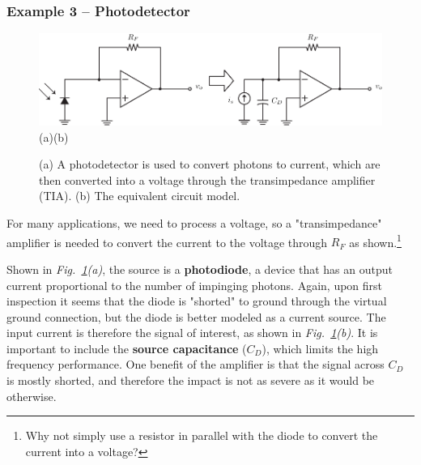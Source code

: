 \subsubsection{Example 3 – Photodetector}
\begin{figure}[tb]
\centering
\includegraphics[width=.8\columnwidth]{ex_photodetect}\\
(a)\hspace{6cm}(b)
\caption{(a) A photodetector is used to convert photons to current, which are then converted into a voltage through the transimpedance amplifier (TIA).  (b) The equivalent circuit model.}
\label{fig:pd_detect}
\end{figure}
For many applications, we need to process a voltage, so a "transimpedance" amplifier is needed to convert the current to the voltage through $R_F$ as shown.\footnote{Why not simply use a resistor in parallel with the diode to convert the current into a voltage?}

Shown in \emph{Fig.~\ref{fig:pd_detect}(a)}, the source is a \textbf{photodiode}, a device that has an output current proportional to the number of impinging photons.  Again, upon first inspection it seems that the diode is "shorted" to ground through the virtual ground connection, but the diode is better modeled as a current source.  The input current is therefore the signal of interest, as shown in \emph{Fig.~\ref{fig:pd_detect}(b)}.  It is important to include the \textbf{source capacitance} ($C_D$), which limits the high frequency performance.  One benefit of the amplifier is that the signal across $C_D$ is mostly shorted, and therefore the impact is not as severe as it would be otherwise.
